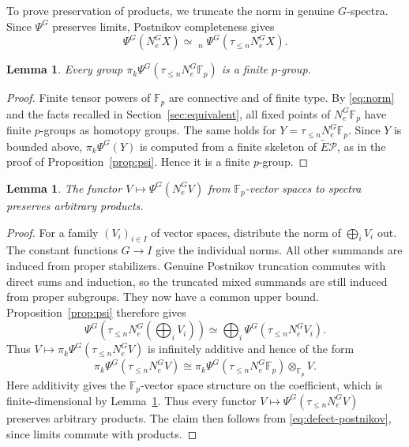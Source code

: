 \documentclass[11pt,a4paper]{article}
\newtheorem{lemma}[thm]{Lemma}
\theoremstyle{definition}
\newcommand{\Fp}{\mathbb F_p}
\newcommand{\tEP}{\widetilde E\mathcal P}
\newcommand{\invlim}{\mathop{\underleftarrow{\mathrm{lim}}}}
\newcommand{\NormG}{N_e^G}
\begin{document}
To prove preservation of products, we truncate the norm in genuine
$G$-spectra. Since $\Psi^G$ preserves limits, Postnikov completeness gives
\begin{equation}\label{eq:defect-postnikov}
 \Psi^G(\NormG X)\simeq
 \invlim_n\Psi^G(\tau_{\le n}\NormG X).
\end{equation}

\begin{lemma}\label{finite_dim}
Every group $\pi_k\Psi^G(\tau_{\le n}\NormG\Fp)$ is a finite $p$-group.
\end{lemma}
\begin{proof}
Finite tensor powers of $\Fp$ are connective and of finite type.
By \eqref{eq:norm} and the facts recalled in
Section~\ref{sec:equivalent}, all fixed points of $\NormG\Fp$
have finite $p$-groups as homotopy groups. The same holds for
$Y=\tau_{\le n}\NormG\Fp$.
Since $Y$ is bounded above, $\pi_k\Psi^G(Y)$ is computed from a
finite skeleton of $\tEP$, as in the proof of
Proposition~\ref{prop:psi}. Hence it is a finite $p$-group.
\end{proof}

\begin{lemma}\label{lem:prod_preservation}
The functor $V\mapsto\Psi^G(\NormG V)$ from $\Fp$-vector spaces
to spectra preserves arbitrary products.
\end{lemma}
\begin{proof}
For a family $(V_i)_{i\in I}$ of vector spaces, distribute the norm
of $\bigoplus_i V_i$ out. The constant functions $G\to I$ give
the individual norms. All other summands are induced from proper
stabilizers. Genuine Postnikov truncation commutes with direct
sums and induction, so the truncated mixed summands are still
induced from proper subgroups. They now have a common upper
bound. Proposition~\ref{prop:psi} therefore gives
\[
 \Psi^G\!\left(\tau_{\le n}\NormG\!\left(\bigoplus_i V_i\right)\right)
 \simeq\bigoplus_i\Psi^G(\tau_{\le n}\NormG V_i).
\]
Thus $V\mapsto\pi_k\Psi^G(\tau_{\le n}\NormG V)$ is infinitely
additive and hence of the form
\[
 \pi_k\Psi^G(\tau_{\le n}\NormG V)\cong
 \pi_k\Psi^G(\tau_{\le n}\NormG\Fp)\otimes_{\Fp}V.
\]
Here additivity gives the $\Fp$-vector space structure on the
coefficient, which is finite-dimensional by Lemma~\ref{finite_dim}.
Thus every functor $V\mapsto\Psi^G(\tau_{\le n}\NormG V)$ preserves
arbitrary products. The claim then follows from
\eqref{eq:defect-postnikov}, since limits commute with products.
\end{proof}
\end{document}
